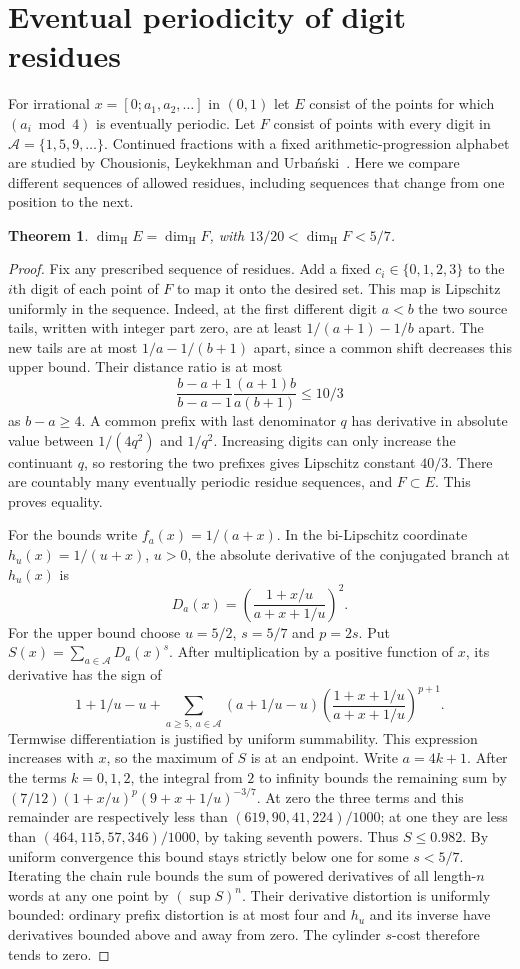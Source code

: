 \documentclass[11pt]{article}
\newtheorem{theorem}{Theorem}
\theoremstyle{definition}
\theoremstyle{remark}
\newcommand{\dimH}{\dim_{\mathrm{H}}}
\begin{document}
\section{Eventual periodicity of digit residues}
For irrational $x=[0;a_1,a_2,\ldots]$ in $(0,1)$ let $E$ consist of
the points for which $(a_i\bmod4)$ is eventually periodic. Let $F$
consist of points with every digit in $\mathcal A=\{1,5,9,\ldots\}$.
Continued fractions with a fixed arithmetic-progression alphabet are
studied by Chousionis, Leykekhman and Urba\'nski~\cite{CLU}. Here
we compare different sequences of allowed residues, including sequences
that change from one position to the next.
\begin{theorem}\label{thm:residues}
$\dimH E=\dimH F$, with $13/20<\dimH F<5/7$.
\end{theorem}
\begin{proof}
Fix any prescribed sequence of residues. Add a fixed $c_i\in\{0,1,2,3\}$
to the $i$th digit of each point of $F$ to map it onto the desired set.
This map is Lipschitz uniformly in the sequence. Indeed, at the first
different digit $a<b$ the two source tails, written with integer part
zero, are at least $1/(a+1)-1/b$ apart. The new tails are at most
$1/a-1/(b+1)$ apart, since a common shift decreases this upper bound.
Their distance ratio is at most
\[
 \frac{b-a+1}{b-a-1}\frac{(a+1)b}{a(b+1)}\le10/3
\]
as $b-a\ge4$. A common prefix with last denominator $q$ has derivative
in absolute value between $1/(4q^2)$ and $1/q^2$. Increasing digits
can only increase the continuant $q$, so restoring the two prefixes
gives Lipschitz constant $40/3$. There are countably many eventually
periodic residue sequences, and $F\subset E$. This proves equality.

For the bounds write $f_a(x)=1/(a+x)$. In the bi-Lipschitz coordinate
$h_u(x)=1/(u+x)$, $u>0$, the absolute derivative of the conjugated
branch at $h_u(x)$ is
\[
 D_a(x)=\left(\frac{1+x/u}{a+x+1/u}\right)^2 .
\]
For the upper bound choose $u=5/2$, $s=5/7$ and $p=2s$.
Put $S(x)=\sum_{a\in\mathcal A}D_a(x)^s$.
After multiplication by a positive function of $x$, its derivative
has the sign of
\[
 1+1/u-u+\sum_{a\ge5,\ a\in\mathcal A}(a+1/u-u)
 \left(\frac{1+x+1/u}{a+x+1/u}\right)^{p+1}.
\]
Termwise differentiation is justified by uniform summability. This
expression increases with $x$, so the maximum of $S$ is at an endpoint.
Write $a=4k+1$. After the terms $k=0,1,2$, the integral from $2$
to infinity bounds the remaining sum by
$(7/12)(1+x/u)^p(9+x+1/u)^{-3/7}$.
At zero the three terms and this remainder are respectively less than
$(619,90,41,224)/1000$; at one they are less than
$(464,115,57,346)/1000$, by taking seventh powers. Thus $S\le0.982$.
By uniform convergence this bound stays strictly below one for some
$s<5/7$. Iterating the chain rule bounds the sum of powered derivatives
of all length-$n$ words at any one point by $(\sup S)^n$. Their
derivative distortion is uniformly bounded: ordinary prefix distortion
is at most four and $h_u$ and its inverse have derivatives bounded
above and away from zero. The cylinder $s$-cost therefore tends to zero.


\end{proof}
\end{document}
